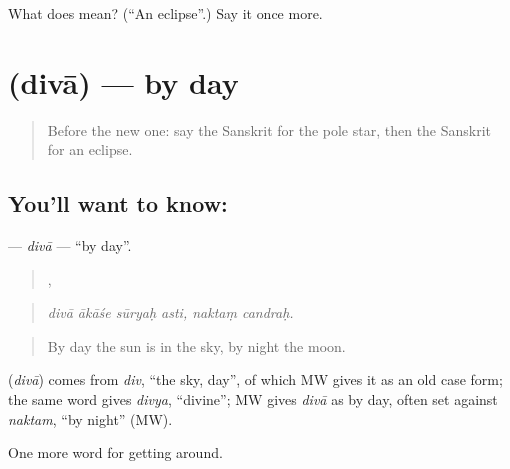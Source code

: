 \begin{tcolorbox}[breakable,colback=teal!4,colframe=teal!35!black,title={Before you move on}]
What does  mean? (\textquotedblleft{}An eclipse\textquotedblright{}.) Say it once more.
\end{tcolorbox}
\section[\texorpdfstring{\sk{दिवा} (divā)}{दिवा (divā)}]{ (divā) — by day}

\label{lesson:SA-C445-diva}



\begin{quote}
Before the new one: say the Sanskrit for the pole star, then the Sanskrit for an eclipse.
\end{quote}

\subsection*{You'll want to know: }
\textbf{} — \emph{divā} — \textquotedblleft{}by day\textquotedblright{}.

\begin{quote}
   ,  
\end{quote}

\begin{quote}
\emph{divā ākāśe sūryaḥ asti, naktaṃ candraḥ.}
\end{quote}

\begin{quote}
By day the sun is in the sky, by night the moon.
\end{quote}

\begin{cousinweb}
\textbf{} (\emph{divā}) comes from \emph{div}, \textquotedblleft{}the sky, day\textquotedblright{}, of which MW gives it as an old case form; the same word gives \emph{divya}, \textquotedblleft{}divine\textquotedblright{}; MW gives \emph{divā} as by day, often set against \emph{naktam}, \textquotedblleft{}by night\textquotedblright{} (MW).
\end{cousinweb}

\begin{grammarlens}[title={What you've built}]
One more word for getting around.
\end{grammarlens}

